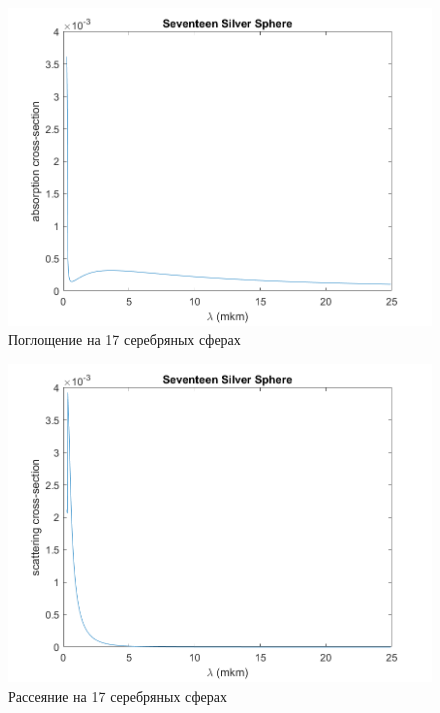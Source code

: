 \begin{figure}[h!]
	\centering
	\includegraphics[width=0.5\linewidth]{seventeenSilverSphereAbsorptionSection}
	\caption{Поглощение на 17 серебряных сферах}
	\label{fig:seventeenSilverSphereAbsorptionSection}
\end{figure} 
\begin{figure}[h!]
	\centering
	\includegraphics[width=0.5\linewidth]{seventeenSilverSphereCrossSection}
	\caption{Рассеяние на 17 серебряных сферах}
	\label{fig:seventeenSilverSphereCrossSection}
\end{figure} \\